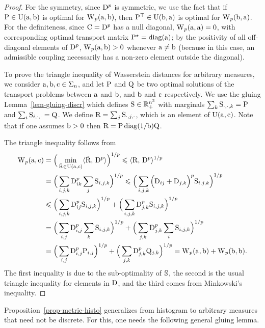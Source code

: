 \begin{proof}
For the symmetry, since $\distD^p$ is symmetric, we use the fact that if $\P \in \CouplingsD(\a,\b)$ is optimal for $\WassD_p(\a,\b)$, then $\P^\top \in \CouplingsD(\b,\a)$ is optimal for $\WassD_p(\b,\a)$. For the definiteness, since $\C = \distD^p$ has a null diagonal, $\WassD_p(\a,\a)=0$, with corresponding optimal transport matrix $\P^\star=\diag(\a)$; by the positivity of all off-diagonal elements of $\distD^p$, $\WassD_p(\a,\b)>0$ whenever $\a\ne \b$ (because in this case, an admissible coupling necessarily has a non-zero element outside the diagonal). 

To prove the triangle inequality of Wasserstein distances for arbitrary measures, we consider $\a,\b,\VectMode{c} \in\simplex_n$, and let $\P$ and $\Q$ be two optimal solutions of the transport problems between $\a$ and $\b$, and $\b$ and $\VectMode{c}$ respectively. 
%
We use the gluing Lemma~\ref{lem-gluing-discr} which defines $\S \in \RR_+^{n^3}$ with marginals $\sum_{k}\S_{\cdot,\cdot,k}=\P$ and $\sum_i \S_{i,\cdot,\cdot}=\Q$. We define $\R=\sum_{j}\S_{\cdot,j,\cdot}$, which is an element of $\CouplingsD(\a,\VectMode{c})$. Note that if one assumes $\b>0$ then $\R = \P \diag(1/\b) \Q$.
%

The triangle inequality follows from
$$\begin{aligned}
\WassD_p(\a,\VectMode{c})&=\Big(\min_{\tilde\R\in \CouplingsD(\a,\VectMode{c})}\dotp{\tilde\R}{\distD^p}\Big)^{1/p} \leq \dotp{\R}{\distD^p}^{1/p}\\
&= \Big(\sum_{i,j,k}  \distD^p_{ik}\sum_{j} \S_{i,j,k} \Big)^{1/p} 
 \leq \Big(\sum_{i,j,k} \left(\distD_{ij}+\distD_{j,k}\Big)^p  \S_{i,j,k} \right)^{1/p} \\
& \leq \Big(\sum_{i,j,k} \distD^p_{ij} \S_{i,j,k} \Big)^{1/p} + \Big(\sum_{i,j,k}\distD^p_{j,k} \S_{i,j,k} \Big)^{1/p} \\
&= \Big(\sum_{i,j} \distD^p_{i,j}  \sum_k \S_{i,j,k} \Big)^{1/p} + \Big(\sum_{j,k} \distD^p_{j,k}  \sum_i \S_{i,j,k} \Big)^{1/p}\\
&= \Big(\sum_{i,j} \distD^p_{i,j}\P_{i,j}\Big)^{1/p} + \Big(\sum_{j,k} \distD^p_{j,k} \Q_{j,k}\Big)^{1/p} 
= \WassD_p(\a,\b) +\WassD_p(\b,\b).
\end{aligned}
$$
%
The first inequality is due to the sub-optimality of $\SS$, the second is the usual triangle inequality for elements in $\distD$, and the third comes from Minkowski's inequality.
\end{proof}

Proposition~\ref{prop-metric-histo} generalizes from histogram to arbitrary measures that need not be discrete. For this, one needs the following general gluing lemma.


